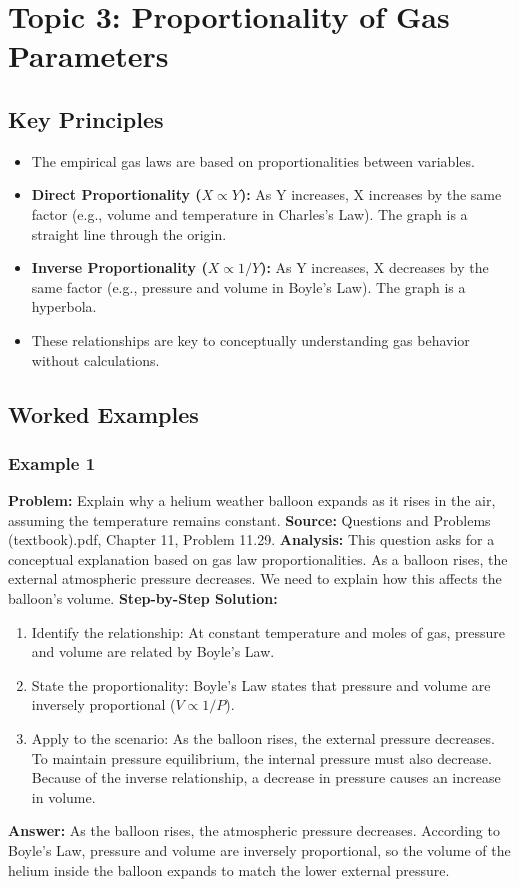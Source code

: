 \documentclass{article}
\begin{document}
\section{Topic 3: Proportionality of Gas Parameters}
\subsection{Key Principles}
\begin{itemize}
    \item The empirical gas laws are based on proportionalities between variables.
    \item \textbf{Direct Proportionality ($X \propto Y$):} As Y increases, X increases by the same factor (e.g., volume and temperature in Charles's Law). The graph is a straight line through the origin.
    \item \textbf{Inverse Proportionality ($X \propto 1/Y$):} As Y increases, X decreases by the same factor (e.g., pressure and volume in Boyle's Law). The graph is a hyperbola.
    \item These relationships are key to conceptually understanding gas behavior without calculations.
\end{itemize}

\subsection{Worked Examples}
\subsubsection{Example 1}
\textbf{Problem:} Explain why a helium weather balloon expands as it rises in the air, assuming the temperature remains constant.
\textbf{Source:} Questions and Problems (textbook).pdf, Chapter 11, Problem 11.29.
\textbf{Analysis:} This question asks for a conceptual explanation based on gas law proportionalities. As a balloon rises, the external atmospheric pressure decreases. We need to explain how this affects the balloon's volume.
\textbf{Step-by-Step Solution:}
\begin{enumerate}
    \item Identify the relationship: At constant temperature and moles of gas, pressure and volume are related by Boyle's Law.
    \item State the proportionality: Boyle's Law states that pressure and volume are inversely proportional ($V \propto 1/P$).
    \item Apply to the scenario: As the balloon rises, the external pressure decreases. To maintain pressure equilibrium, the internal pressure must also decrease. Because of the inverse relationship, a decrease in pressure causes an increase in volume.
\end{enumerate}
\textbf{Answer:} As the balloon rises, the atmospheric pressure decreases. According to Boyle's Law, pressure and volume are inversely proportional, so the volume of the helium inside the balloon expands to match the lower external pressure.
\end{document}
